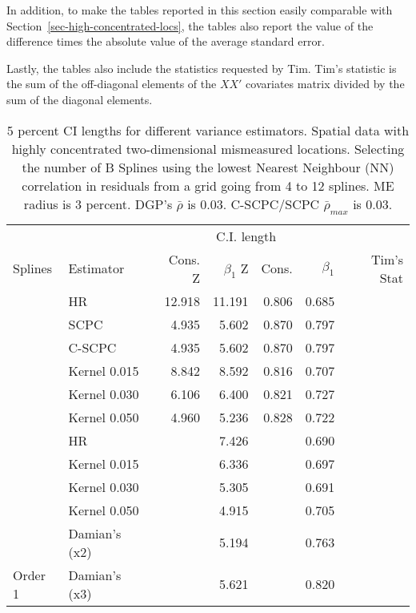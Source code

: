 \documentclass[
]{article}
\begin{document}
In addition, to make the tables reported in this section easily comparable with
Section~\ref{sec-high-concentrated-locs}, the tables also report the
value of the difference times the absolute value of the average standard error.

Lastly, the tables also include the statistics requested by Tim. Tim's
statistic is the sum of the off-diagonal elements of the \(XX'\)
covariates matrix divided by the sum of the diagonal elements.

\hypertarget{tbl-lights-me-matching-rhos}{}
\begin{longtable}[t]{llrrrrr}
\caption{\label{tbl-lights-me-matching-rhos}5 percent CI lengths for different variance estimators. Spatial data
with highly concentrated two-dimensional mismeasured locations.
Selecting the number of B Splines using the lowest Nearest Neighbour
(NN) correlation in residuals from a grid going from 4 to 12 splines. ME
radius is 3 percent. DGP's \(\bar\rho\) is 0.03. C-SCPC/SCPC
\(\bar\rho_{max}\) is 0.03. }\tabularnewline

\toprule
\multicolumn{2}{c}{ } & \multicolumn{4}{c}{C.I. length} \\
\cmidrule(l{3pt}r{3pt}){3-6}
Splines & Estimator & Cons. Z & $\beta_1$ Z & Cons. & $\beta_1$ & Tim's Stat\\
\midrule
 & HR & 12.918 & 11.191 & 0.806 & 0.685 & \\

 & SCPC & 4.935 & 5.602 & 0.870 & 0.797 & \\

 & C-SCPC & 4.935 & 5.602 & 0.870 & 0.797 & \\

 & Kernel 0.015 & 8.842 & 8.592 & 0.816 & 0.707 & \\

 & Kernel 0.030 & 6.106 & 6.400 & 0.821 & 0.727 & \\

\multirow[t]{-6}{*}{\raggedright\arraybackslash } & Kernel 0.050 & 4.960 & 5.236 & 0.828 & 0.722 & \multirow[t]{-6}{*}{\raggedleft\arraybackslash 128.897}\\
\cmidrule{1-7}
 & HR &  & 7.426 &  & 0.690 & \\

 & Kernel 0.015 &  & 6.336 &  & 0.697 & \\

 & Kernel 0.030 &  & 5.305 &  & 0.691 & \\

 & Kernel 0.050 &  & 4.915 &  & 0.705 & \\

 & Damian's (x2) &  & 5.194 &  & 0.763 & \\

\multirow[t]{-6}{*}{\raggedright\arraybackslash Order 1} & Damian's (x3) &  & 5.621 &  & 0.820 & \multirow[t]{-6}{*}{\raggedleft\arraybackslash 7.372}\\
\bottomrule
\end{longtable}
\end{document}
